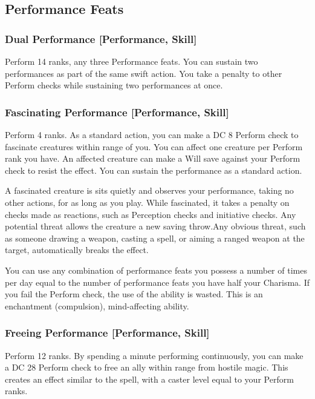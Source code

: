 \subsection{Performance Feats}

\subsubsection{Dual Performance [Performance, Skill]}
\featpres Perform 14 ranks, any three Performance feats.
\featben You can sustain two performances as part of the same swift action. You take a  penalty to other Perform checks while sustaining two performances at once.

\subsubsection{Fascinating Performance [Performance, Skill]}
\featpre Perform 4 ranks.
\featben As a standard action, you can make a DC 8 Perform check to fascinate creatures within \rngmed range of you. You can affect one creature per Perform rank you have. An affected creature can make a Will save against your Perform check to resist the effect. You can sustain the performance as a standard action.

A fascinated creature is sits quietly and observes your performance, taking no other actions, for as long as you play. While fascinated, it takes a  penalty on checks made as reactions, such as Perception checks and initiative checks. Any potential threat allows the creature a new saving throw.Any obvious threat, such as someone drawing a weapon, casting a spell, or aiming a ranged weapon at the target, automatically breaks the effect.

You can use any combination of performance feats you possess a number of times per day equal to the number of performance feats you have \add half your Charisma. If you fail the Perform check, the use of the ability is wasted. This is an enchantment (compulsion), mind-affecting ability.

\subsubsection{Freeing Performance [Performance, Skill]}
\featpre Perform 12 ranks.
\featben By spending a minute performing continuously, you can make a DC 28 Perform check to free an ally within \rngmed range from hostile magic. This creates an effect similar to the  spell, with a caster level equal to your Perform ranks.

